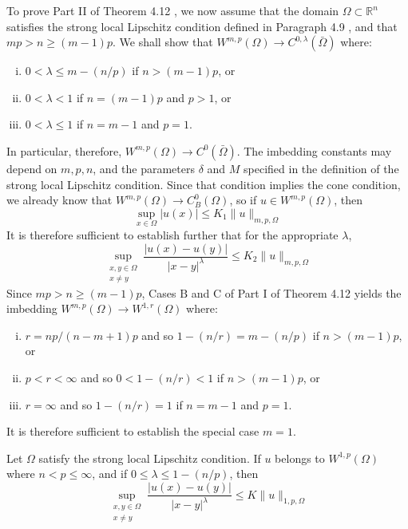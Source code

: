 \begin{para}
  To prove Part II of Theorem 4.12 , we now assume that the domain $\Omega \subset \mathbb{R}^n$ satisfies the strong local Lipschitz condition defined in Paragraph 4.9 , and that $m p>n \geq(m-1) p$. We shall show that $W^{m, p}(\Omega) \rightarrow C^{0, \lambda}(\bar{\Omega})$ where:
  \begin{enumerate}[(i)]
    \item $0<\lambda \leq m-(n / p)$ if $n>(m-1) p$, or
    \item $0<\lambda<1$ if $n=(m-1) p$ and $p>1$, or
    \item $0<\lambda \leq 1$ if $n=m-1$ and $p=1$.
  \end{enumerate}
  In particular, therefore, $W^{m, p}(\Omega) \rightarrow C^0(\bar{\Omega})$. The imbedding constants may depend on $m, p, n$, and the parameters $\delta$ and $M$ specified in the definition of the strong local Lipschitz condition. Since that condition implies the cone condition, we already know that $W^{m, p}(\Omega) \rightarrow C_B^0(\Omega)$, so if $u \in W^{m, p}(\Omega)$, then
  \[
  \sup _{x \in \Omega}|u(x)| \leq K_1\|u\|_{m, p, \Omega}
  \]
  It is therefore sufficient to establish further that for the appropriate $\lambda$,
  \[
  \sup _{\substack{x, y \in \Omega \\ x \neq y}} \frac{|u(x)-u(y)|}{|x-y|^\lambda} \leq K_2\|u\|_{m, p, \Omega}
  \]
  Since $m p>n \geq(m-1) p$, Cases $\mathrm{B}$ and $\mathrm{C}$ of Part I of Theorem 4.12 yields the imbedding $W^{m, p}(\Omega) \rightarrow W^{1, r}(\Omega)$ where:
  \begin{enumerate}[(i)]
    \item $r=n p /(n-m+1) p$ and so $1-(n / r)=m-(n / p)$ if $n>(m-1) p$, or
    \item $p<r<\infty$ and so $0<1-(n / r)<1$ if $n>(m-1) p$, or
    \item $r=\infty$ and so $1-(n / r)=1$ if $n=m-1$ and $p=1$.
  \end{enumerate}
  It is therefore sufficient to establish the special case $m=1$.
\end{para}


\begin{lemma}
  Let $\Omega$ satisfy the strong local Lipschitz condition. If $u$ belongs to $W^{1, p}(\Omega)$ where $n<p \leq \infty$, and if $0 \leq \lambda \leq 1-(n / p)$, then
  \[
  \sup _{\substack{x, y \in \Omega \\ x \neq y}} \frac{|u(x)-u(y)|}{|x-y|^\lambda} \leq K\|u\|_{1, p, \Omega}
  \]
\end{lemma}

